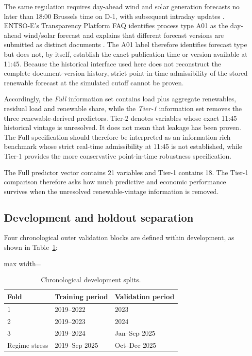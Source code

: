 The same regulation requires day-ahead wind and solar generation forecasts no later than 18:00 Brussels time on D-1, with subsequent intraday updates \citep{eureg543}. ENTSO-E's Transparency Platform FAQ identifies process type A01 as the day-ahead wind/solar forecast and explains that different forecast versions are submitted as distinct documents \citep{entsoefaq2024}. The A01 label therefore identifies forecast type but does not, by itself, establish the exact publication time or version available at 11:45. Because the historical interface used here does not reconstruct the complete document-version history, strict point-in-time admissibility of the stored renewable forecast at the simulated cutoff cannot be proven.

Accordingly, the \emph{Full} information set contains load plus aggregate renewables, residual load and renewable share, while the \emph{Tier-1} information set removes the three renewable-derived predictors. Tier-2 denotes variables whose exact 11:45 historical vintage is unresolved. It does not mean that leakage has been proven. The Full specification should therefore be interpreted as an information-rich benchmark whose strict real-time admissibility at 11:45 is not established, while Tier-1 provides the more conservative point-in-time robustness specification.

The Full predictor vector contains 21 variables and Tier-1 contains 18. The Tier-1 comparison therefore asks how much predictive and economic performance survives when the unresolved renewable-vintage information is removed.

\subsection{Development and holdout separation}

Four chronological outer validation blocks are defined within development, as shown in Table~\ref{tab:splits}:

\begin{table}[htbp]
\centering
\caption{Chronological development splits.}
\label{tab:splits}
\begin{adjustbox}{max width=\textwidth}
\begin{tabular}{lll}
\toprule
Fold & Training period & Validation period \\
\midrule
1 & 2019--2022 & 2023 \\
2 & 2019--2023 & 2024 \\
3 & 2019--2024 & Jan--Sep 2025 \\
Regime stress & 2019--Sep 2025 & Oct--Dec 2025 \\
\bottomrule
\end{tabular}
\end{adjustbox}
\end{table}

